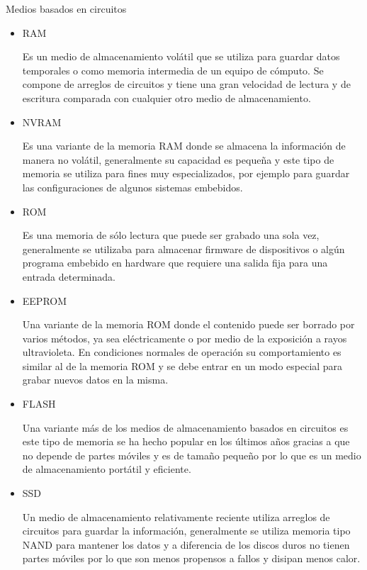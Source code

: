 %
%
Medios basados en circuitos
\begin{itemize}
  \item RAM
  
  Es un medio de almacenamiento vol\'{a}til que se utiliza para guardar datos temporales o como memoria intermedia de un equipo de c\'{o}mputo. Se compone de arreglos de circuitos y tiene una gran velocidad de lectura y de escritura comparada con cualquier otro medio de almacenamiento.
  
  \item NVRAM
  
  Es una variante de la memoria RAM donde se almacena la informaci\'{o}n de manera no vol\'{a}til, generalmente su capacidad es peque\~{n}a y este tipo de memoria se utiliza para fines muy especializados, por ejemplo para guardar las configuraciones de algunos sistemas embebidos.
  
  \item ROM
  
  Es una memoria de s\'{o}lo lectura que puede ser grabado una sola vez, generalmente se utilizaba para almacenar firmware de dispositivos o alg\'{u}n programa embebido en hardware que requiere una salida fija para una entrada determinada.
  
  \item EEPROM
  
  Una variante de la memoria ROM donde el contenido puede ser borrado por varios m\'{e}todos, ya sea el\'{e}ctricamente o por medio de la exposici\'{o}n a rayos ultravioleta. En condiciones normales de operaci\'{o}n su comportamiento es similar al de la memoria ROM y se debe entrar en un modo especial para grabar nuevos datos en la misma.
  
  \item FLASH
  
  Una variante m\'{a}s de los medios de almacenamiento basados en circuitos es este tipo de memoria se ha hecho popular en los \'{u}ltimos a\~{n}os gracias a que no depende de partes m\'{o}viles y es de tama\~{n}o peque\~{n}o por lo que es un medio de almacenamiento port\'{a}til y eficiente.
  
  \item SSD
  
  Un medio de almacenamiento relativamente reciente utiliza arreglos de circuitos para guardar la informaci\'{o}n, generalmente se utiliza memoria tipo NAND para mantener los datos y a diferencia de los discos duros no tienen partes m\'{o}viles por lo que son menos propensos a fallos y disipan menos calor.
  
\end{itemize}
